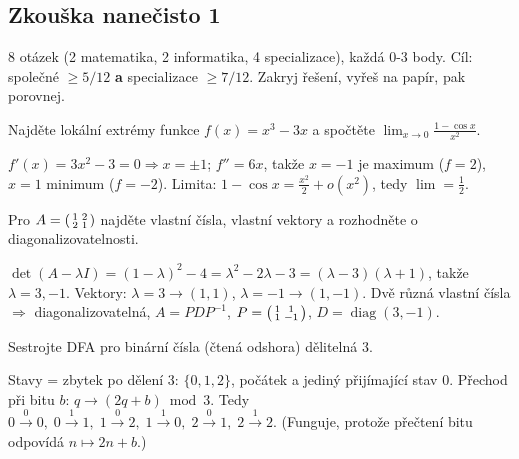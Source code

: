 \subsection*{Zkouška nanečisto 1}
\begin{infobox}[title={Pokyny}]
\footnotesize 8 otázek (2 matematika, 2 informatika, 4 specializace), každá 0-3 body. Cíl: společné $\ge5/12$ \textbf{a} specializace $\ge7/12$. Zakryj řešení, vyřeš na papír, pak porovnej.
\end{infobox}

\begin{zadani}Najděte lokální extrémy funkce $f(x)=x^3-3x$ a spočtěte $\lim_{x\to0}\frac{1-\cos x}{x^2}$.\end{zadani}
\begin{reseni}$f'(x)=3x^2-3=0\Rightarrow x=\pm1$; $f''=6x$, takže $x{=}{-}1$ je maximum ($f={2}$), $x{=}1$ minimum ($f={-}2$). Limita: $1-\cos x=\frac{x^2}{2}+o(x^2)$, tedy $\lim=\frac12$.\end{reseni}

\begin{zadani}Pro $A=\begin{psmallmatrix}1&2\\2&1\end{psmallmatrix}$ najděte vlastní čísla, vlastní vektory a rozhodněte o diagonalizovatelnosti.\end{zadani}
\begin{reseni}$\det(A-\lambda I)=(1-\lambda)^2-4=\lambda^2-2\lambda-3=(\lambda-3)(\lambda+1)$, takže $\lambda=3,-1$. Vektory: $\lambda{=}3\to(1,1)$, $\lambda{=}{-}1\to(1,-1)$. Dvě různá vlastní čísla $\Rightarrow$ diagonalizovatelná, $A=PDP^{-1}$, $P=\begin{psmallmatrix}1&1\\1&-1\end{psmallmatrix}$, $D=\operatorname{diag}(3,-1)$.\end{reseni}

\begin{zadani}Sestrojte DFA pro binární čísla (čtená odshora) dělitelná 3.\end{zadani}
\begin{reseni}Stavy = zbytek po dělení 3: $\{0,1,2\}$, počátek a jediný přijímající stav $0$. Přechod při bitu $b$: $q\to(2q+b)\bmod 3$. Tedy $0\xrightarrow{0}0,\;0\xrightarrow{1}1,\;1\xrightarrow{0}2,\;1\xrightarrow{1}0,\;2\xrightarrow{0}1,\;2\xrightarrow{1}2$. (Funguje, protože přečtení bitu odpovídá $n\mapsto 2n+b$.)\end{reseni}

